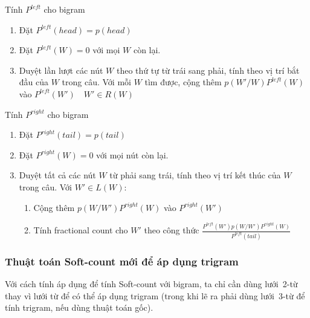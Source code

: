 \documentclass[a4paper,oneside,14pt]{extbook} %
\begin{document}
\begin{algo}\caption{Tính $P^{left}$ cho bi\-gram}
\label{algo:sc2:pleft}
\begin{enumerate}
\item Đặt $P^{left}(head) = p(head)$
\item Đặt $P^{left}(W) = 0$ với mọi $W$ còn lại.
\item Duyệt lần lượt các nút $W$ theo thứ tự từ trái sang phải, tính
  theo vị trí bắt đầu của $W$ trong câu.
  Với mỗi $W$ tìm được, cộng thêm $p(W'/W)P^{left}(W)$ vào $P^{left}(W')\quad
  W' \in R(W)$
\end{enumerate}
\end{algo}

\begin{algo}\caption{Tính $P^{right}$ cho bi\-gram}
\label{algo:sc2:pright}
\begin{enumerate}
\item Đặt $P^{right}(tail) = p(tail)$
\item Đặt $P^{right}(W) = 0$ với mọi nút còn lại.
\item Duyệt tất cả các nút $W$ từ phải sang trái, tính theo vị trí kết
  thúc của $W$ trong câu. Với $W' \in L(W)$:
  \begin{enumerate}
  \item Cộng thêm $p(W/W')P^{right}(W)$ vào $P^{right}(W')$
  \item Tính fractional count cho $W'$ theo công thức
    $\displaystyle\frac{P^{left}(W')p(W/W')P^{right}(W)}{P^{left}(tail)}$
  \end{enumerate}
\end{enumerate}
\end{algo}


\subsubsection{Thuật toán Soft-count mới để áp dụng tri\-gram}

Với cách tính áp dụng để tính Soft-count với bi\-gram, ta chỉ cần dùng
lưới~2-từ thay vì lưới từ để có thể áp dụng tri\-gram (trong khi lẽ ra
phải dùng lưới~3-từ để tính tri\-gram, nếu dùng thuật toán gốc).


\end{document}
